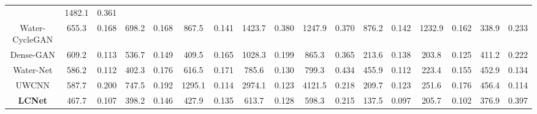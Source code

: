 \documentclass[journal]{IEEEtran}
\begin{document}
\begin{table}[htbp]
{\begin{tabular}{|c|cc|cc|cc|cc|cc|cc|cc|cc|}
&1482.1                       & 0.361                        \\
Water-CycleGAN \cite{water-gan}              & 655.3                        & 0.168                        & 698.2                        & 0.168                        & 867.5                         & 0.141                        & 1423.7                        & 0.380                        & 1247.9                        & 0.370                        & 876.2                        & 0.142                        & 1232.9                       & 0.162                        & {\color[HTML]{FE0000} 338.9} & {\color[HTML]{343434} 0.233} \\
Dense-GAN \cite{dense-gan}                    & 609.2                        & 0.113                        & 536.7                        & 0.149                        & {\color[HTML]{FE0000} 409.5}  & {\color[HTML]{343434} 0.165} & 1028.3                        & 0.199                        & 865.3                         & {\color[HTML]{343434} 0.365} & 213.6                        & {\color[HTML]{343434} 0.138} & {\color[HTML]{FE0000} 203.8} & {\color[HTML]{3166FF} 0.125} & 411.2                        & 0.222                        \\
Water-Net \cite{water-net}                   & 586.2                        & {\color[HTML]{3166FF} 0.112} & {\color[HTML]{3166FF} 402.3} & {\color[HTML]{343434} 0.176} & 616.5                         & {\color[HTML]{343434} 0.171} & {\color[HTML]{3166FF} 785.6}  & {\color[HTML]{343434} 0.130} & {\color[HTML]{3166FF} 799.3}  & 0.434                        & 455.9                        & {\color[HTML]{3166FF} 0.112} & 223.4                        & 0.155                        & 452.9                        & {\color[HTML]{3166FF} 0.134} \\
UWCNN \cite{uwcnn}                       & {\color[HTML]{3166FF} 587.7} & {\color[HTML]{343434} 0.200} & {\color[HTML]{343434} 747.5} & {\color[HTML]{3166FF} 0.192} & {\color[HTML]{343434} 1295.1} & {\color[HTML]{FE0000} 0.114} & {\color[HTML]{343434} 2974.1} & {\color[HTML]{FE0000} 0.123} & {\color[HTML]{343434} 4121.5} & {\color[HTML]{3166FF} 0.218} & {\color[HTML]{3166FF} 209.7} & {\color[HTML]{343434} 0.123} & {\color[HTML]{343434} 251.6} & {\color[HTML]{343434} 0.176} & {\color[HTML]{343434} 456.4} & {\color[HTML]{FE0000} 0.114} \\
\textbf{LCNet}                & {\color[HTML]{FE0000} 467.7} & {\color[HTML]{FE0000} 0.107} & {\color[HTML]{FE0000} 398.2} & {\color[HTML]{FE0000} 0.146} & {\color[HTML]{3166FF} 427.9}  & {\color[HTML]{3166FF} 0.135} & {\color[HTML]{FE0000} 613.7}  & {\color[HTML]{3166FF} 0.128} & {\color[HTML]{FE0000} 598.3}  & {\color[HTML]{FE0000} 0.215} & {\color[HTML]{FE0000} 137.5} & {\color[HTML]{FE0000} 0.097} & {\color[HTML]{3166FF} 205.7} & {\color[HTML]{FE0000} 0.102} & {\color[HTML]{3166FF} 376.9} & 0.397 \\ \hline
\end{tabular}
}
\label{tab2}
\end{table}
\end{document}
